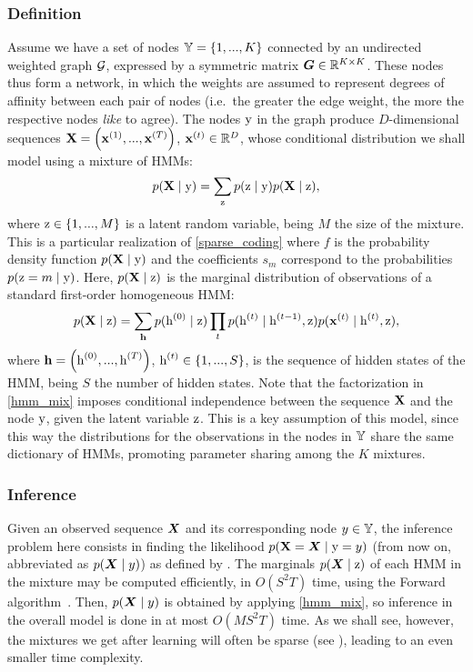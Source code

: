 \subsubsection{Definition}
\label{sec:definition}
Assume we have a set of nodes ${\mathbb{Y}}=\{1, ..., K\}$ connected by an undirected weighted graph ${\mathcal{G}}$, expressed by a symmetric matrix ${\bm{G}} \in \mathbb{R}^{K \times K}$. These nodes thus form a network, in which the weights are assumed to represent degrees of affinity between each pair of nodes (i.e.\ the greater the edge weight, the more the respective nodes \textit{like} to agree). The nodes ${\textnormal{y}}$ in the graph produce $D$-dimensional sequences ${\mathbf{X}} = \left({\mathbf{x}}^{(1)}, ...,{\mathbf{x}}^{(T)} \right)$, ${\mathbf{x}}^{(t)} \in \mathbb{R}^D$, whose conditional distribution we shall model using a mixture of HMMs:
\begin{equation}
\label{hmm_mix}
p({\mathbf{X}} \mid {\textnormal{y}}) = \sum_{{\textnormal{z}}} p({\textnormal{z}}\mid{\textnormal{y}}) p({\mathbf{X}} \mid {\textnormal{z}}),
\end{equation}
where ${\textnormal{z}} \in \{1, ..., M\}$ is a latent random variable, being $M$ the size of the mixture. This is a particular realization of \eqref{sparse_coding} where $f$ is the probability density function $p({\mathbf{X}} \mid {\textnormal{y}})$ and the coefficients $s_m$ correspond to the probabilities $p({\textnormal{z}} = m \mid {\textnormal{y}})$. Here, $p({\mathbf{X}} \mid {\textnormal{z}})$ is the marginal distribution of observations of a standard first-order homogeneous HMM:
\begin{equation}
\label{hmm}
p({\mathbf{X}} \mid {\textnormal{z}}) = \sum_{{\mathbf{h}}} p({\textnormal{h}}^{(0)}\mid{\textnormal{z}}) \prod_t p({\textnormal{h}}^{(t)}\mid{\textnormal{h}}^{(t-1)},{\textnormal{z}}) p({\mathbf{x}}^{(t)}\mid{\textnormal{h}}^{(t)},{\textnormal{z}}),
\end{equation}
where ${\mathbf{h}} = \left({\textnormal{h}}^{(0)}, ...,{\textnormal{h}}^{(T)} \right)$, ${\textnormal{h}}^{(t)} \in \{1, ..., S\}$, is the sequence of hidden states of the HMM, being $S$ the number of hidden states. Note that the factorization in \eqref{hmm_mix} imposes conditional independence between the sequence ${\mathbf{X}}$ and the node ${\textnormal{y}}$, given the latent variable ${\textnormal{z}}$. This is a key assumption of this model, since this way the distributions for the observations in the nodes in ${\mathbb{Y}}$ share the same dictionary of HMMs, promoting parameter sharing among the $K$ mixtures.

\subsubsection{Inference}
\label{sec:inference}
Given an observed sequence ${\bm{X}}$ and its corresponding node $y \in {\mathbb{Y}}$, the inference problem here consists in finding the likelihood $p({\mathbf{X}}={\bm{X}} \mid {\textnormal{y}}=y)$ (from now on, abbreviated as $p({\bm{X}} \mid y)$) as defined by  . The marginals $p({\bm{X}}\mid{\textnormal{z}})$ of each HMM in the mixture may be computed efficiently, in $O(S^2T)$ time, using the Forward algorithm~\citet{Rabiner1986}. Then, $p({\bm{X}} \mid y)$ is obtained by applying \eqref{hmm_mix}, so inference in the overall model is done in at most $O(MS^2T)$ time. As we shall see, however, the mixtures we get after learning will often be sparse (see ), leading to an even smaller time complexity.

